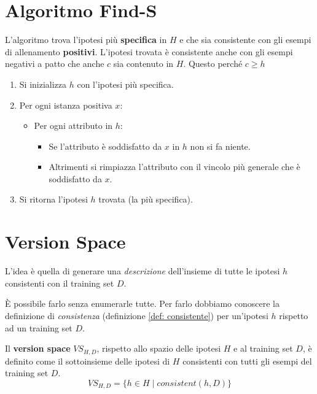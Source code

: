 \section{Algoritmo Find-S}
L'algoritmo trova l'ipotesi pi\`u \textbf{specifica} in $H$ e che sia consistente con gli esempi di allenamento
\textbf{positivi}. L'ipotesi trovata \`e consistente anche con gli esempi negativi a patto che anche $c$ sia
contenuto in $H$. Questo perch\'e $c \geq h$
\begin{enumerate}
	\item Si inizializza $h$ con l'ipotesi pi\`u specifica.
	\item Per ogni istanza positiva $x$:
	      \begin{itemize}
		      \item Per ogni attributo in $h$:
		            \begin{itemize}
			            \item Se l'attributo \`e soddisfatto da $x$ in $h$ non si fa niente.
			            \item Altrimenti si rimpiazza l'attributo con il vincolo pi\`u generale che \`e soddisfatto da
			                  $x$.
		            \end{itemize}
	      \end{itemize}
	\item Si ritorna l'ipotesi $h$ trovata (la pi\`u specifica).
\end{enumerate}

\section{Version Space}
L'idea \`e quella di generare una \emph{descrizione} dell'insieme di tutte le ipotesi $h$ consistenti con il training
set $D$.

\`E possibile farlo senza enumerarle tutte. Per farlo dobbiamo conoscere la definizione di \emph{consistenza} (definizione
\ref{def: consistente}) per un'ipotesi $h$ rispetto ad un training set $D$.

\begin{definition}
	Il \textbf{version space} $VS_{H, D}$, rispetto allo spazio delle ipotesi $H$ e al training set $D$, \`e definito
	come il sottoinsieme delle ipotesi di $H$ consistenti con tutti gli esempi del training set $D$.
	\[ VS_{H, D} = \{ h \in H \mid consistent(h, D) \} \]
\end{definition}

